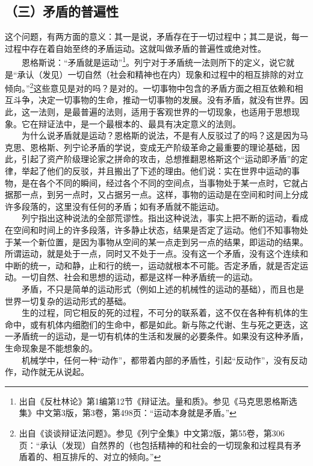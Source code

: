 \documentclass[cn,11pt,chinese]{elegantbook}
\def\myformat#1{\hfil\hfil #1}
\begin{document}
\subsection*{\myformat{（三）矛盾的普遍性}}
这个问题，有两方面的意义：其一是说，矛盾存在于一切过程中；其二是说，每一过程中存在着自始至终的矛盾运动。这就叫做矛盾的普遍性或绝对性。\\
　　恩格斯说：“矛盾就是运动”\footnote[4]{ 出自《反杜林论》第1编第12节《辩证法。量和质》。参见《马克思恩格斯选集》中文第3版，第3卷，第498页：“运动本身就是矛盾。”}。列宁对于矛盾统一法则所下的定义，说它就是“承认（发见）一切自然（社会和精神也在内）现象和过程中的相互排除的对立倾向。”\footnote[5]{ 出自《谈谈辩证法问题》。参见《列宁全集》中文第2版，第55卷，第306页：“承认（发现）自然界的（也包括精神的和社会的一切现象和过程具有矛盾着的、相互排斥的、对立的倾向。”}这些意见是对的吗？是对的。一切事物中包含的矛盾方面之相互依赖和相互斗争，决定一切事物的生命，推动一切事物的发展。没有矛盾，就没有世界。因此，这一法则，是最普遍的法则，适用于客观世界的一切现象，也适用于思想现象。它在辩证法中，是一个最根本的、最具有决定意义的法则。\\
　　为什么说矛盾就是运动？恩格斯的说法，不是有人反驳过了的吗？这是因为马克思、恩格斯、列宁论矛盾的学说，变成无产阶级革命之最重要的理论基础，因此，引起了资产阶级理论家之拼命的攻击，总想推翻恩格斯这个“运动即矛盾”的定律，举起了他们的反驳，并且搬出了下述的理由。他们说：实在世界中运动的事物，是在各个不同的瞬间，经过各个不同的空间点，当事物处于某一点时，它就占据那一点，到另一点时，又占据另一点。这样，事物的运动是在空间和时间上分成许多段落的，这里没有任何的矛盾；如有矛盾就不能运动。\\
　　列宁指出这种说法的全部荒谬性。指出这种说法，事实上把不断的运动，看成在空间和时间上的许多段落，许多静止状态，结果是否定了运动。他们不知事物处于某一个新位置，是因为事物从空间的某一点走到另一点的结果，即运动的结果。所谓运动，就是处于一点，同时又不处于一点。没有这一个矛盾，没有这个连续和中断的统一，动和静，止和行的统一，运动就根本不可能。否定矛盾，就是否定运动。一切自然、社会和思想的运动，都是这样一种矛盾统一的运动。\\
　　矛盾，不只是简单的运动形式（例如上述的机械性的运动的基础），而且也是世界一切复杂的运动形式的基础。\\
　　生的过程，同它相反的死的过程，不可分的联系着，这不仅在各种有机体的生命中，或有机体内细胞们的生命中，都是如此。新与陈之代谢、生与死之更迭，这一矛盾统一的运动，是一切有机体的生活和发展的必要条件。如果没有这种矛盾，生命现象是不能想象的。\\
　　机械学中，任何一种“动作”，都带着内部的矛盾性，引起“反动作”，没有反动作，动作就无从说起。\\
\end{document}

